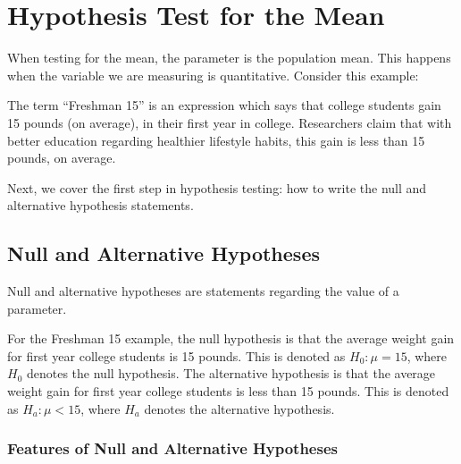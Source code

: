 \documentclass[
]{book}
\begin{document}
\hypertarget{testmean}{%
\section{Hypothesis Test for the Mean}\label{testmean}}

When testing for the mean, the parameter is the population mean. This happens when the variable we are measuring is quantitative. Consider this example:

The term ``Freshman 15'' is an expression which says that college students gain 15 pounds (on average), in their first year in college. Researchers claim that with better education regarding healthier lifestyle habits, this gain is less than 15 pounds, on average.

Next, we cover the first step in hypothesis testing: how to write the null and alternative hypothesis statements.

\hypertarget{null-and-alternative-hypotheses}{%
\subsection{Null and Alternative Hypotheses}\label{null-and-alternative-hypotheses}}

Null and alternative hypotheses are statements regarding the value of a parameter.

For the Freshman 15 example, the null hypothesis is that the average weight gain for first year college students is 15 pounds. This is denoted as \(H_0: \mu = 15\), where \(H_0\) denotes the null hypothesis. The alternative hypothesis is that the average weight gain for first year college students is less than 15 pounds. This is denoted as \(H_a: \mu < 15\), where \(H_a\) denotes the alternative hypothesis.

\hypertarget{features-of-null-and-alternative-hypotheses}{%
\subsubsection{Features of Null and Alternative Hypotheses}\label{features-of-null-and-alternative-hypotheses}}
\end{document}

